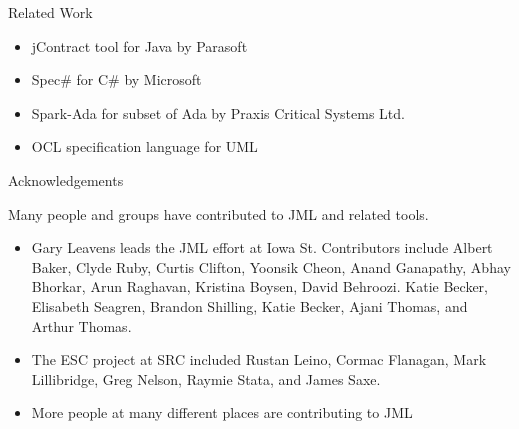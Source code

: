 \documentclass[
pdf,
nocolorBG,
slideColor,
erik,
]{prosper}
\begin{document}
\begin{slide}{Related Work}
\vspace*{-4ex}

\begin{itemize}
\item {\blue jContract} tool for Java by {\green Parasoft}
\item {\blue Spec\#} for {\green C\#} by {\green Microsoft}
\item {\blue Spark-Ada} for subset of Ada by {\green Praxis Critical Systems Ltd.}
\item {\blue OCL} specification language for {\green UML}
\end{itemize}
\end{slide}

\begin{slide}{Acknowledgements}

\vspace*{-4ex}
Many people and groups have contributed to JML and related tools.

\begin{itemize}
\item {\scriptsize Gary Leavens leads the JML effort at Iowa St. 
    Contributors include Albert Baker, Clyde Ruby, Curtis
    Clifton, Yoonsik Cheon, Anand Ganapathy, Abhay Bhorkar, Arun
    Raghavan, Kristina Boysen, David Behroozi. Katie Becker, Elisabeth
    Seagren, Brandon Shilling, Katie Becker, Ajani Thomas, and Arthur
    Thomas.}
\item {\scriptsize The ESC project at SRC included Rustan 
    Leino, Cormac Flanagan, Mark Lillibridge, Greg Nelson, Raymie
    Stata, and James Saxe.}
\item {\scriptsize More people at many different places are contributing to JML}
\end{itemize}
  
\end{slide}
\end{document}
